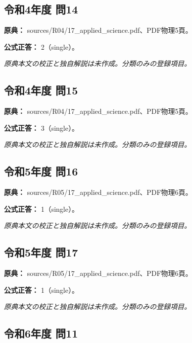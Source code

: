 \subsection{令和4年度 問14}
\label{q:r04-reg-applied-14}

\noindent\textbf{原典：} sources/R04/17\_applied\_science.pdf、PDF物理5頁。

\textbf{公式正答：} 2（single）。

\par\textit{原典本文の校正と独自解説は未作成。分類のみの登録項目。}

\subsection{令和4年度 問15}
\label{q:r04-reg-applied-15}

\noindent\textbf{原典：} sources/R04/17\_applied\_science.pdf、PDF物理5頁。

\textbf{公式正答：} 3（single）。

\par\textit{原典本文の校正と独自解説は未作成。分類のみの登録項目。}

\subsection{令和5年度 問16}
\label{q:r05-reg-applied-16}

\noindent\textbf{原典：} sources/R05/17\_applied\_science.pdf、PDF物理6頁。

\textbf{公式正答：} 1（single）。

\par\textit{原典本文の校正と独自解説は未作成。分類のみの登録項目。}

\subsection{令和5年度 問17}
\label{q:r05-reg-applied-17}

\noindent\textbf{原典：} sources/R05/17\_applied\_science.pdf、PDF物理6頁。

\textbf{公式正答：} 1（single）。

\par\textit{原典本文の校正と独自解説は未作成。分類のみの登録項目。}

\subsection{令和6年度 問11}
\label{q:r06-reg-applied-11}

